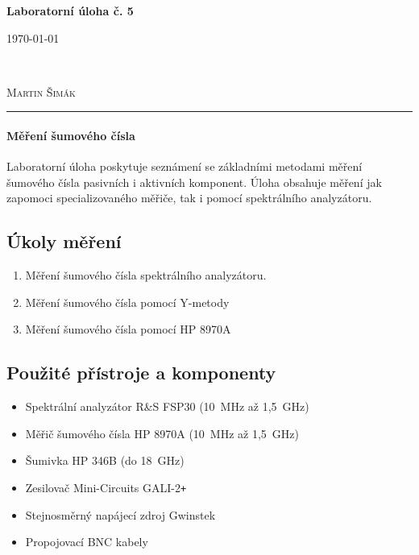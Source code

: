 \documentclass[11pt,a4paper]{article}
\newcommand{\plus}{{\texttt{+}}}
\begin{document}

\begin{center}
    {\LARGE\textbf{Laboratorní úloha č. 5}}\\[3mm]
    \begin{minipage}{0.4\textwidth}
        \begin{flushleft}
            \textsc{\today}
        \end{flushleft}
    \end{minipage}
    ~
    \begin{minipage}{0.4\textwidth}
        \begin{flushright}
            \textsc{Martin Šimák}
        \end{flushright}
    \end{minipage}
    \noindent\rule{14.5cm}{0.4pt}
\end{center}

\paragraph*{Měření šumového čísla} Laboratorní úloha poskytuje seznámení se základními metodami měření šumového čísla pasivních i aktivních komponent. Úloha obsahuje měření jak zapomoci specializovaného měřiče, tak i pomocí spektrálního analyzátoru.

\subsection*{Úkoly měření}
\begin{enumerate}
    \item Měření šumového čísla spektrálního analyzátoru.
    \item Měření šumového čísla pomocí Y-metody
    \item Měření šumového čísla pomocí HP 8970A
\end{enumerate}

\subsection*{Použité přístroje a komponenty}
\begin{itemize}
    \item Spektrální analyzátor R\&S FSP30 (10~MHz až 1,5~GHz)
    \item Měřič šumového čísla HP 8970A (10~MHz až 1,5~GHz)
    \item Šumivka HP 346B (do 18~GHz)
    \item Zesilovač Mini-Circuits GALI-2\plus
    \item Stejnosměrný napájecí zdroj Gwinstek
    \item Propojovací BNC kabely
\end{itemize}
\end{document}

